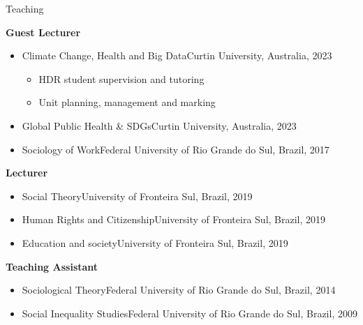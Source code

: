 \begin{rSection}{Teaching}

\large  {\textbf{Guest Lecturer}}

\begin{itemize}
\item{Climate Change, Health and Big Data}\hfill{Curtin University, Australia, 2023}
    \begin{itemize}
        \item{HDR student supervision and tutoring}
        \item{Unit planning, management and marking}
    \end{itemize}
\item{Global Public Health \& SDGs}\hfill{Curtin University, Australia,  2023}
\item{Sociology of Work}\hfill{Federal University of Rio Grande do Sul, Brazil, 2017}
\end{itemize}

\vspace{1em}
\large  {\textbf{Lecturer}}

\begin{itemize}
\item{Social Theory}\hfill{University of Fronteira Sul, Brazil, 2019}
\item{Human Rights and Citizenship}\hfill{University of Fronteira Sul, Brazil, 2019}
\item{Education and society}\hfill{University of Fronteira Sul, Brazil, 2019}
\end{itemize}

\vspace{1em}
\large  {\textbf{Teaching Assistant}}

\begin{itemize}
\item{Sociological Theory}\hfill{Federal University of Rio Grande do Sul, Brazil, 2014}
\item{Social Inequality Studies}\hfill{Federal University of Rio Grande do Sul, Brazil, 2009}
\end{itemize}

\end{rSection}